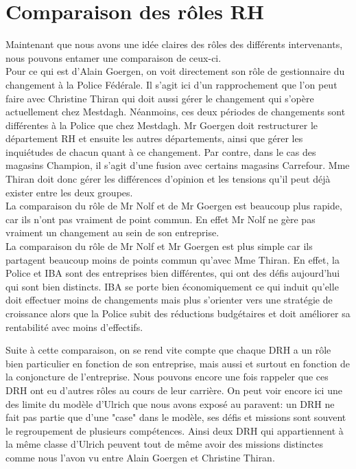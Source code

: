 \section{Comparaison des rôles RH}

Maintenant que nous avons une idée claires des rôles des différents intervenants, nous pouvons entamer une comparaison de ceux-ci. \\


Pour ce qui est d'Alain Goergen, on voit directement son rôle de gestionnaire du changement à la Police Fédérale. Il s'agit ici d'un rapprochement que l'on peut faire avec Christine Thiran qui doit aussi gérer le changement qui s'opère actuellement chez Mestdagh. Néanmoins, ces deux périodes de changements sont différentes à la Police que chez Mestdagh. Mr Goergen doit restructurer le département RH et ensuite les autres départements, ainsi que gérer les inquiétudes de chacun quant à ce changement. Par contre, dans le cas des magasins Champion, il s'agit d'une fusion avec certains magasins Carrefour. Mme Thiran doit donc gérer les différences d'opinion et les tensions qu'il peut déjà exister entre les deux groupes. \\


La comparaison du rôle de Mr Nolf et de Mr Goergen est beaucoup plus rapide, car ils n'ont pas vraiment de point commun. En effet Mr Nolf ne gère pas vraiment un changement au sein de son entreprise. \\

La comparaison du rôle de Mr Nolf et Mr Goergen est plus simple car ils partagent beaucoup moins de points commun qu'avec Mme Thiran. En effet, la Police et IBA sont des entreprises bien différentes, qui ont des défis aujourd'hui qui sont bien distincts. IBA se porte bien économiquement ce qui induit qu'elle doit effectuer moins de changements mais plus s'orienter vers une stratégie de croissance alors que la Police subit des réductions budgétaires et doit améliorer sa rentabilité avec moins d'effectifs. 


Suite à cette comparaison, on se rend vite compte que chaque DRH a un rôle bien particulier en fonction de son entreprise, mais aussi et surtout en fonction de la conjoncture de l'entreprise. Nous pouvons encore une fois rappeler que ces DRH ont eu d'autres rôles au cours de leur carrière. 
On peut voir encore ici une des limite du modèle d'Ulrich que nous avons exposé au paravent: un DRH ne fait pas partie que d'une "case" dans le modèle, ses défis et missions sont souvent le regroupement de plusieurs compétences. Ainsi deux DRH qui appartiennent à la même classe d'Ulrich peuvent tout de même avoir des missions distinctes comme nous l'avon vu entre Alain Goergen et Christine Thiran.
